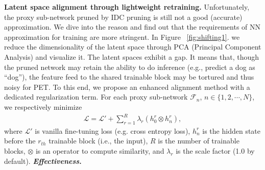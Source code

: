 
\noindent \textbf{Latent space alignment through lightweight retraining.}
Unfortunately, the proxy sub-network pruned by IDC pruning is still not a good (accurate) approximation.
We dive into the reason and find out that the requirements of NN approximation for training are more stringent.
In Figure ~\ref{fig:shifting1}. we reduce the dimensionality of the latent space through PCA (Principal Component Analysis) and visualize it.
The latent spaces exhibit a gap.
It means that, though the pruned network may retain the ability to do inference (e.g., predict a dog as ``dog''), the feature feed to the shared trainable block may be tortured and thus noisy for PET.
To this end, we propose an enhanced alignment method with a dedicated regularization term. 
For each proxy sub-network $\mathcal{F}_{n}$, $n \in \{1, 2, \cdots, N\}$, we respectively minimize
\begin{align}
%
	\mathcal{L} = \mathcal{L'} + \sum_{r=1}^{R}\lambda_{r} (h_{0}^{r} \otimes  h_{n}^{r}),
%
	\label{eq-loss_cosine_finetune}
\end{align}
where $\mathcal{L'}$ is vanilla fine-tuning loss (e.g. cross entropy loss), $h_{n}^{r}$ is the hidden state before the $r_{th}$ trainable block (i.e., the input), $R$ is the number of trainable blocks, $ \otimes $ is an operator to compute similarity, and $\lambda_{r}$ is the scale factor (1.0 by default).
\textbf{\textit{Effectiveness}.}


